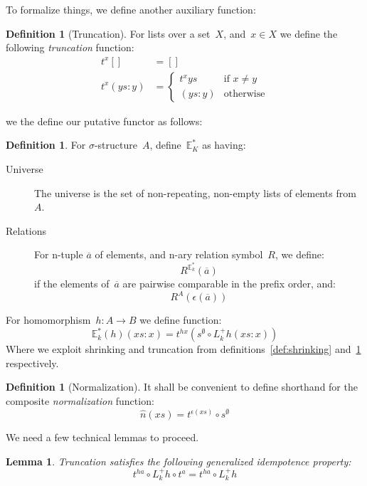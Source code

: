 \documentclass{article}
\theoremstyle{plain}
\newtheorem{lemma}[theorem]{Lemma}
\theoremstyle{definition}
\newtheorem{definition}[theorem]{Definition}
\theoremstyle{remark}
\numberwithin{theorem}{section}
\begin{document}
To formalize things, we define another auxiliary function:
\begin{definition}[Truncation]
\label{def:truncation}
For lists over a set~$X$, and~$x \in X$ we define the following \emph{truncation} function:
\begin{align*}
    t^x [] &= []\\
    t^x (ys:y) &=
    \begin{cases}
    t^x ys &\mbox{if } x \neq y\\
    (ys:y) &\mbox{otherwise}
    \end{cases}
\end{align*}
\end{definition}
we the define our putative functor as follows:
\begin{definition}
For $\sigma$-structure~$A$, define~$\mathbb{E}^*_K$ as having:
\begin{description}
\item[Universe] The universe is the set of non-repeating, non-empty lists of elements from~$A$.
\item[Relations] For n-tuple $\overline{a}$ of elements, and n-ary relation symbol~$R$, we define:
\begin{equation*}
    R^{\mathbb{E}^*_k}(\overline{a})
\end{equation*}
if the elements of~$\overline{a}$ are pairwise comparable in the prefix order, and:
\begin{equation*}
    R^A(\epsilon(\overline{a}))
\end{equation*}
\end{description}
For homomorphism~$h : A \rightarrow B$ we define function:
\begin{equation*}
    \mathbb{E}^*_k(h)(xs:x) = t^{h x}(s^\emptyset \circ L^+_k h (xs:x))
\end{equation*}
Where we exploit shrinking and truncation from definitions~\ref{def:shrinking} and~\ref{def:truncation} respectively.
\end{definition}
\begin{definition}[Normalization]
It shall be convenient to define shorthand for the composite \emph{normalization} function:
\begin{equation*}
    \hat{n}(xs) = t^{\epsilon(xs)} \circ s^\emptyset
\end{equation*}
\end{definition}
We need a few technical lemmas to proceed.
\begin{lemma}
\label{lem:t-idem}
Truncation satisfies the following generalized idempotence property:
\begin{equation*}
t^{h a} \circ L^+_k h \circ t^a = t^{h a} \circ L^+_k h
\end{equation*}
\end{lemma}
\end{document}

